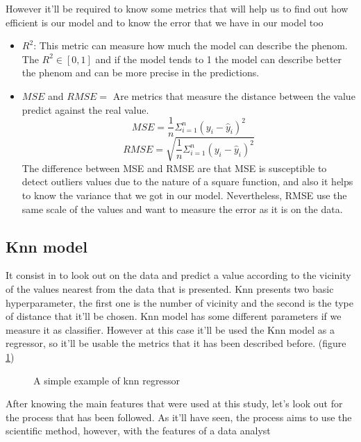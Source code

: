 \documentclass{article}
\begin{document}
However it'll be required to know some metrics that will help us to find out how efficient is our model and to know the error that we have in our model too
\begin{itemize}
  \item $R^2$: This metric can measure how much the model can describe the phenom. The $R^2 \in [0,1]$ and if the model tends to 1 the model can describe better the phenom and can be more precise in the predictions.
  \item $MSE$ and $RMSE = $ Are metrics that measure the distance between the value predict against the real value.
  $$MSE=\frac{1}{n}\Sigma^{n}_{i=1}(y_i-\hat{y}_i)^2 $$
    $$RMSE=\sqrt{\frac{1}{n}\Sigma^{n}_{i=1}(y_i-\hat{y}_i)^2} $$
    The difference between MSE and RMSE are that MSE is susceptible to detect outliers values due to the nature of a square function, and also it helps to know the variance that we got in our model. Nevertheless, RMSE use the same scale of the values and want to measure the error as it is on the data.

\end{itemize}

\subsection{Knn model}
It consist in to look out on the data and predict a value according to the vicinity of the values nearest from the data that is presented. Knn presents two basic hyperparameter, the first one is the number of vicinity and the second is the type of distance that it'll be chosen.
Knn model has some different parameters if we measure it as classifier. However at this case it'll be used the Knn model as a regressor, so it'll be usable the metrics that it has been described before.
(figure \ref{fig:example4})
\begin{figure}[h]
  \centering
{}

  \caption{A simple example of knn regressor}
  \label{fig:example4}
\end{figure}
After knowing the main features that were used at this study, let's look out for the process that has been followed. As it'll have seen, the process aims to use the scientific method, however, with the features of a data analyst
\end{document}
